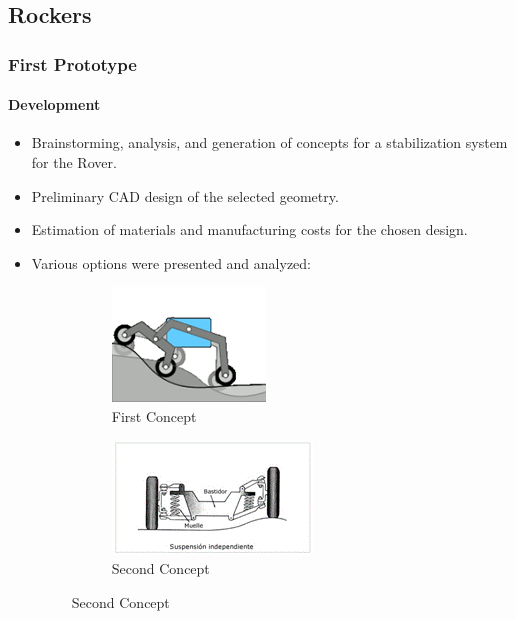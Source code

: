 \documentclass{article}
\begin{document}
\subsection{Rockers}

\subsubsection{First Prototype}
\paragraph[short]{Development}
\begin{itemize}
    \item Brainstorming, analysis, and generation of concepts for a stabilization system for the Rover.
    \item Preliminary CAD design of the selected geometry.
    \item Estimation of materials and manufacturing costs for the chosen design.
    \item Various options were presented and analyzed:
    \begin{figure}[H]
        \centering
        \begin{subfigure}{.3\textwidth}
          \centering
          \includegraphics[width=.9\linewidth]{Images/Rockers/Concept1.png}
          \caption{First Concept}
          
        \end{subfigure}%
        \begin{subfigure}{.3\textwidth}
          \centering
          \includegraphics[width=.9\linewidth]{Images/Rockers/Concept2.png}
          \caption{Second Concept}
          

\end{subfigure}
\end{figure}
\end{itemize}
\end{document}
